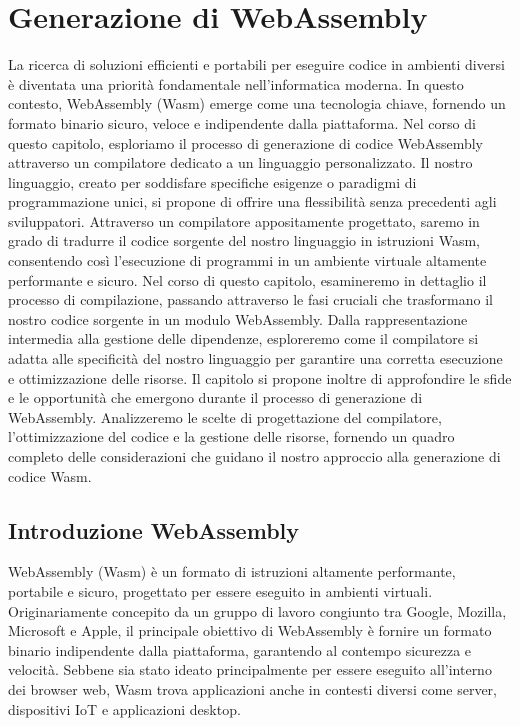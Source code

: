 \documentclass[../../main.tex]{subfiles}
\begin{document}
\chapter{Generazione di WebAssembly}
La ricerca di soluzioni efficienti e portabili per eseguire codice in ambienti diversi è diventata una priorità fondamentale nell'informatica moderna. In questo contesto, WebAssembly (Wasm) emerge come una tecnologia chiave, fornendo un formato binario sicuro, veloce e indipendente dalla piattaforma. Nel corso di questo capitolo, esploriamo il processo di generazione di codice WebAssembly attraverso un compilatore dedicato a un linguaggio personalizzato.
Il nostro linguaggio, creato per soddisfare specifiche esigenze o paradigmi di programmazione unici, si propone di offrire una flessibilità senza precedenti agli sviluppatori. Attraverso un compilatore appositamente progettato, saremo in grado di tradurre il codice sorgente del nostro linguaggio in istruzioni Wasm, consentendo così l'esecuzione di programmi in un ambiente virtuale altamente performante e sicuro.
Nel corso di questo capitolo, esamineremo in dettaglio il processo di compilazione, passando attraverso le fasi cruciali che trasformano il nostro codice sorgente in un modulo WebAssembly. Dalla rappresentazione intermedia alla gestione delle dipendenze, esploreremo come il compilatore si adatta alle specificità del nostro linguaggio per garantire una corretta esecuzione e ottimizzazione delle risorse.
Il capitolo si propone inoltre di approfondire le sfide e le opportunità che emergono durante il processo di generazione di WebAssembly. Analizzeremo le scelte di progettazione del compilatore, l'ottimizzazione del codice e la gestione delle risorse, fornendo un quadro completo delle considerazioni che guidano il nostro approccio alla generazione di codice Wasm.

\section{Introduzione WebAssembly}
WebAssembly (Wasm) è un formato di istruzioni altamente performante, portabile e sicuro, progettato per essere eseguito in ambienti virtuali. Originariamente concepito da un gruppo di lavoro congiunto tra Google, Mozilla, Microsoft e Apple, il principale obiettivo di WebAssembly è fornire un formato binario indipendente dalla piattaforma, garantendo al contempo sicurezza e velocità. Sebbene sia stato ideato principalmente per essere eseguito all'interno dei browser web, Wasm trova applicazioni anche in contesti diversi come server, dispositivi IoT e applicazioni desktop.
\end{document}

